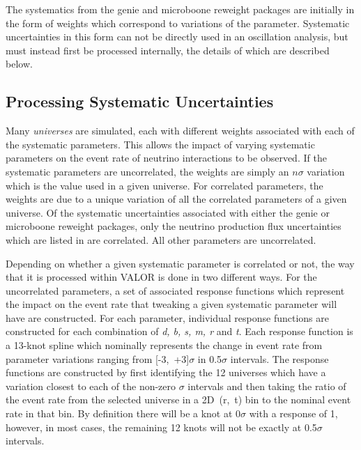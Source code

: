 The systematics from the \gls{genie} and \gls{microboone} reweight packages are initially in the form of weights which correspond to variations of the parameter. Systematic uncertainties in this form can not be directly used in an oscillation analysis, but must instead first be processed internally, the details of which are described below.

\subsection{Processing Systematic Uncertainties}\label{sec:systematic_validation}

Many \textit{universes} are simulated, each with different weights associated with each of the systematic parameters. This allows the impact of varying systematic parameters on the event rate of neutrino interactions to be observed. If the systematic parameters are uncorrelated, the weights are simply an $n \sigma$ variation which is the value used in a given universe. For correlated parameters, the weights are due to a unique variation of all the correlated parameters of a given universe. Of the systematic uncertainties associated with either the \gls{genie} or \gls{microboone} reweight packages, only the neutrino production flux uncertainties which are listed in  are correlated. All other parameters are uncorrelated. 

Depending on whether a given systematic parameter is correlated or not, the way that it is processed within VALOR is done in two different ways. For the uncorrelated parameters, a set of associated response functions which represent the impact on the event rate that tweaking a given systematic parameter will have are constructed. For each parameter, individual response functions are constructed for each combination of \textit{d, b, s, m, r} and \textit{t}. Each response function is a 13-knot spline which nominally represents the change in event rate from parameter variations ranging from \mbox{[-3, +3]$\sigma$} in 0.5$\sigma$ intervals. The response functions are constructed by first identifying the 12 universes which have a variation closest to each of the non-zero $\sigma$ intervals and then taking the ratio of the event rate from the selected universe in a \mbox{2D (r, t)} bin to the nominal event rate in that bin. By definition there will be a knot at 0$\sigma$ with a response of 1, however, in most cases, the remaining 12 knots will not be exactly at 0.5$\sigma$ intervals. 

